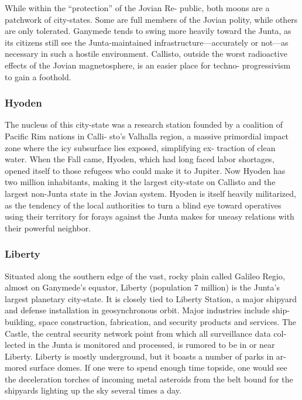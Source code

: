 While within the ``protection'' of the Jovian Re-
public, both moons are a patchwork of city-states. 
Some are full members of the Jovian polity, while 
others are only tolerated. Ganymede tends to swing 
more heavily toward the Junta, as its citizens still 
see the Junta-maintained infrastructure—accurately 
or not—as necessary in such a hostile environment. 
Callisto, outside the worst radioactive effects of the 
Jovian magnetosphere, is an easier place for techno-
progressivism to gain a foothold.

\subsubsection{Hyoden}

The nucleus of this city-state was a research station 
founded by a coalition of Pacific Rim nations in Calli-
sto's Valhalla region, a massive primordial impact zone 
where the icy subsurface lies exposed, simplifying ex-
traction of clean water. When the Fall came, Hyoden, 
which had long faced labor shortages, opened itself 
to those refugees who could make it to Jupiter. Now 
Hyoden has two million inhabitants, making it the 
largest city-state on Callisto and the largest non-Junta 
state in the Jovian system. Hyoden is itself heavily 
militarized, as the tendency of the local authorities to 
turn a blind eye toward operatives using their territory 
for forays against the Junta makes for uneasy relations 
with their powerful neighbor.

\subsubsection{Liberty}

Situated along the southern edge of the vast, rocky 
plain called Galileo Regio, almost on Ganymede's 
equator, Liberty (population 7 million) is the Junta's 
largest planetary city-state. It is closely tied to Liberty 
Station, a major shipyard and defense installation in 
geosynchronous orbit. Major industries include ship-
building, space construction, fabrication, and security 
products and services. The Castle, the central security 
network point from which all surveillance data col-
lected in the Junta is monitored and processed, is 
rumored to be in or near Liberty. Liberty is mostly 
underground, but it boasts a number of parks in ar-
mored surface domes. If one were to spend enough 
time topside, one would see the deceleration torches 
of incoming metal asteroids from the belt bound for 
the shipyards lighting up the sky several times a day.

